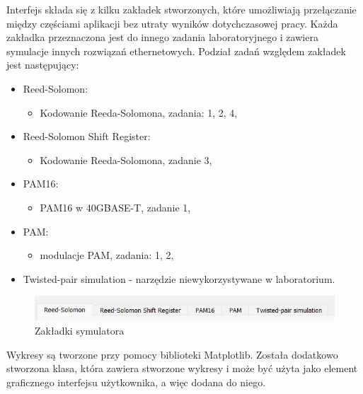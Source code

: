 Interfejs składa się z kilku zakładek stworzonych, które umożliwiają przełączanie między częściami aplikacji bez utraty wyników dotychczasowej pracy. Każda zakładka przeznaczona jest do innego zadania laboratoryjnego i zawiera symulacje innych rozwiązań ethernetowych. Podział zadań względem zakładek jest następujący:
\begin{itemize}
    \item Reed-Solomon:
    \begin{itemize}
        \item Kodowanie Reeda-Solomona, zadania: 1, 2, 4,
    \end{itemize}
    \item Reed-Solomon Shift Register:
    \begin{itemize}
        \item Kodowanie Reeda-Solomona, zadanie 3,
    \end{itemize}
    \item PAM16:
    \begin{itemize}
        \item PAM16 w 40GBASE-T, zadanie 1,
    \end{itemize}
    \item PAM:
    \begin{itemize}
        \item modulacje PAM, zadania: 1, 2,
    \end{itemize}
    \item Twisted-pair simulation - narzędzie niewykorzystywane w laboratorium.
\end{itemize}

\begin{figure}[ht]
    \centering
    \includegraphics{images/zakladki.png}
    \caption{Zakładki symulatora}
    \label{fig:zakladki_image}
\end{figure}

Wykresy są tworzone przy pomocy biblioteki Matplotlib. Została dodatkowo stworzona klasa, która zawiera stworzone wykresy i może być użyta jako element graficznego interfejsu użytkownika, a więc dodana do niego.

